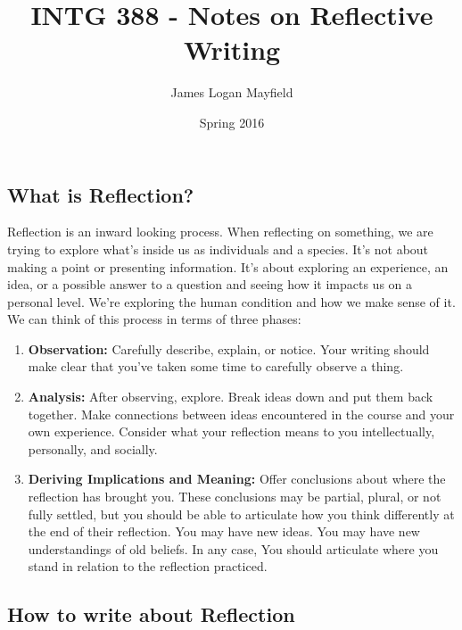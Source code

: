 \documentclass[]{article}
\title{INTG 388 - Notes on Reflective Writing}
\author{James Logan Mayfield }
\date{ Spring 2016 }
\begin{document}
\maketitle
\thispagestyle{empty}

\subsection*{What is Reflection?}

Reflection is an inward looking process. When reflecting on something, we are trying to explore what's inside us as individuals and a species. It's not about making a point or presenting information. It's about exploring an experience, an idea, or a possible answer to a question and seeing how it impacts us on a personal level. We're exploring the human condition and how we make sense of it. We can think of this process in terms of three phases:
\begin{enumerate}
\item \textbf{Observation:} Carefully describe, explain, or notice. Your writing should make clear that you've taken some time to carefully observe a thing. \newline
\item \textbf{Analysis:} After observing, explore. Break ideas down and put them back together. Make connections between ideas encountered in the course and your own experience. Consider what your reflection means to you intellectually, personally, and socially. \newline
\item \textbf{Deriving Implications and Meaning:} Offer conclusions about where the reflection has brought you. These conclusions may be partial, plural, or not fully settled, but you should be able to articulate how you think differently at the end of their reflection. You may have new ideas. You may have new understandings of old beliefs. In any case, You should articulate where you stand in relation to the reflection practiced. 
\end{enumerate}

\subsection*{How to write about Reflection}
\end{document}
